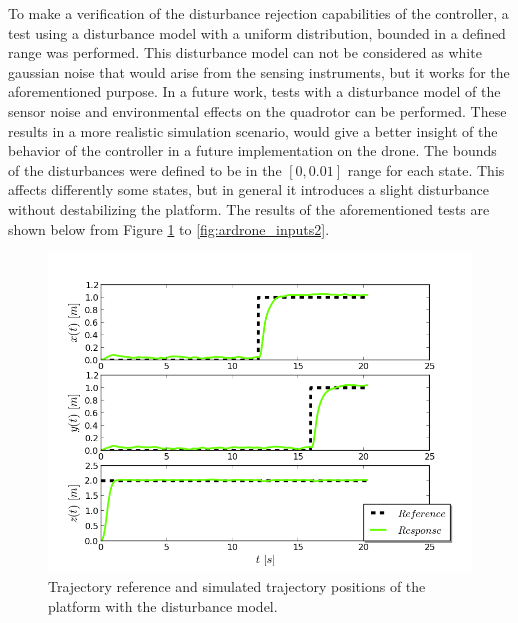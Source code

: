 To make a verification of the disturbance rejection capabilities of the controller, a test using a disturbance model with a uniform distribution, bounded in a defined range was performed. This disturbance model can not be considered as white gaussian noise that would arise from the sensing instruments, but it works for the aforementioned purpose. In a future work, tests with a disturbance model of the sensor noise and environmental effects on the quadrotor can be performed. These results in a more realistic simulation scenario, would give a better insight of the behavior of the controller in a future implementation on the drone. The bounds of the disturbances were defined to be in the $[0, 0.01]$ range for each state. This affects differently some states, but in general it introduces a slight disturbance without destabilizing the platform. The results of the aforementioned tests are shown below from Figure \ref{fig:ardrone_pos2} to \ref{fig:ardrone_inputs2}.\\

\begin{figure}[H]
\centering
\includegraphics[scale=0.7]{Images/Chapter5/ardrone/T1_noise/position_control.png}
\caption{Trajectory reference and simulated trajectory positions of the platform with the disturbance model.}
\label{fig:ardrone_pos2}
\end{figure}

